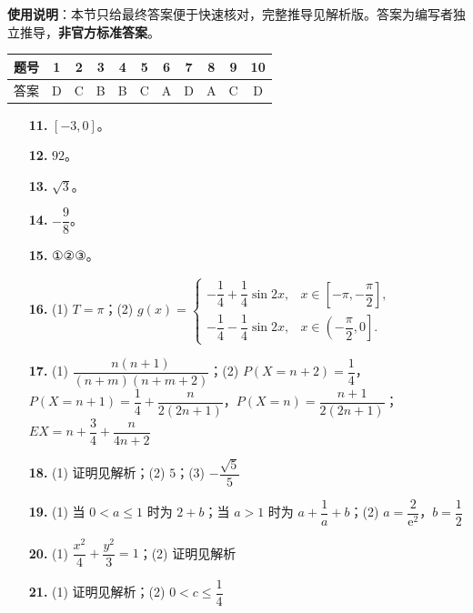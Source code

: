 
\begin{gknotice}
\textbf{使用说明}：本节只给最终答案便于快速核对，完整推导见解析版。答案为编写者独立推导，\textbf{非官方标准答案}。
\end{gknotice}

\begin{center}\begin{tabular}{ccccccccccc}
\toprule
题号 & 1 & 2 & 3 & 4 & 5 & 6 & 7 & 8 & 9 & 10 \\
\midrule
答案 & D & C & B & B & C & A & D & A & C & D \\
\bottomrule
\end{tabular}\end{center}

\begin{itemize}[leftmargin=2.6em]
  \item[\textbf{11.}] $[-3,0]$。
  \item[\textbf{12.}] $92$。
  \item[\textbf{13.}] $\sqrt3$。
  \item[\textbf{14.}] $-\dfrac98$。
  \item[\textbf{15.}] ①②③。
\end{itemize}

\begin{itemize}[leftmargin=2.6em]
  \item[\textbf{16.}] (1) $T=\pi$；(2) $g(x)=\begin{cases}-\dfrac14+\dfrac14\sin2x,&x\in\left[-\pi,-\dfrac\pi2\right],\\[6pt]-\dfrac14-\dfrac14\sin2x,&x\in\left(-\dfrac\pi2,0\right].\end{cases}$
  \item[\textbf{17.}] (1) $\dfrac{n(n+1)}{(n+m)(n+m+2)}$；(2) $P(X=n+2)=\dfrac14$，$P(X=n+1)=\dfrac14+\dfrac{n}{2(2n+1)}$，$P(X=n)=\dfrac{n+1}{2(2n+1)}$；$EX=n+\dfrac34+\dfrac{n}{4n+2}$
  \item[\textbf{18.}] (1) 证明见解析；(2) $5$；(3) $-\dfrac{\sqrt5}5$
  \item[\textbf{19.}] (1) 当 $0<a\leqslant1$ 时为 $2+b$；当 $a>1$ 时为 $a+\dfrac1a+b$；(2) $a=\dfrac2{\mathrm e^2}$，$b=\dfrac12$
  \item[\textbf{20.}] (1) $\dfrac{x^2}4+\dfrac{y^2}3=1$；(2) 证明见解析
  \item[\textbf{21.}] (1) 证明见解析；(2) $0<c\leqslant\dfrac14$
\end{itemize}
